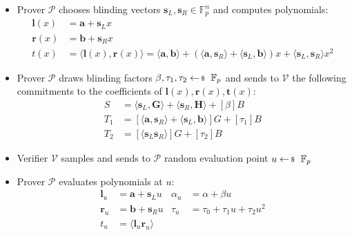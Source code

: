 \documentclass[../../book.tex]{subfiles}
\begin{document}
\begin{definition}
    \begin{itemize}
        \item Prover $\mathcal{P}$ chooses blinding vectors $\mathbf{s}_L, \mathbf{s}_R \in \mathbb{F}_p^n$ and computes polynomials:
            \begin{align*}
                \mathbf{l}(x) &= \mathbf{a} + \mathbf{s}_L x \\
                \mathbf{r}(x) &= \mathbf{b} + \mathbf{s}_R x \\
                t(x) &= \langle \mathbf{l}(x), \mathbf{r}(x) \rangle = \langle \mathbf{a}, \mathbf{b} \rangle + (\langle \mathbf{a}, \mathbf{s}_R \rangle + \langle \mathbf{s}_L, \mathbf{b} \rangle) x + \langle \mathbf{s}_L, \mathbf{s}_R \rangle x^2
            \end{align*}
        \item Prover $\mathcal{P}$ draws blinding factors $\beta, \tau_1, \tau_2 \leftarrowS \mathbb{F}_p$ and sends to $\mathcal{V}$ the following commitments to the coefficients of $\mathbf{l}(x), \mathbf{r}(x), \mathbf{t}(x)$:
            \begin{equation}
                \begin{aligned}
                    S &= \langle \mathbf{s}_L, \mathbf{G} \rangle + \langle \mathbf{s}_R, \mathbf{H} \rangle + [\beta]B\\
                    T_1 &= [\langle \mathbf{a}, \mathbf{s}_R \rangle + \langle \mathbf{s}_L, \mathbf{b} \rangle]G + [\tau_1]B \\
                    T_2 &= [\langle \mathbf{s}_L \mathbf{s}_R \rangle]G + [\tau_2]B
                \end{aligned}
            \end{equation}
        \item Verifier $\mathcal{V}$ samples and sends to $\mathcal{P}$ random evaluation point $u \leftarrowS \mathbb{F}_p$
        \item Prover $\mathcal{P}$ evaluates polynomials at $u$:
            \begin{equation}
                \begin{aligned}
                    \mathbf{l}_u & = \mathbf{a} + \mathbf{s}_L u & \alpha_u &= \alpha + \beta u\\
                    \mathbf{r}_u &= \mathbf{b} + \mathbf{s}_R u & \tau_u &= \tau_0 + \tau_1 u + \tau_2 u^2\\
                    t_u &= \langle \mathbf{l}_u \mathbf{r}_u \rangle & 
                \end{aligned}

\end{equation}
\end{itemize}
\end{definition}
\end{document}
